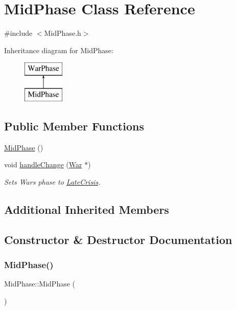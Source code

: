 \hypertarget{class_mid_phase}{}\section{Mid\+Phase Class Reference}
\label{class_mid_phase}


{\ttfamily \#include $<$Mid\+Phase.\+h$>$}

Inheritance diagram for Mid\+Phase\+:\begin{figure}[H]
\begin{center}
\leavevmode
\includegraphics[height=2.000000cm]{class_mid_phase}
\end{center}
\end{figure}
\subsection*{Public Member Functions}
\begin{DoxyCompactItemize}
\item 
\mbox{\hyperlink{class_mid_phase_a27b87eaf77be8ef4077a8ca2a86bc11b}{Mid\+Phase}} ()
\item 
void \mbox{\hyperlink{class_mid_phase_a7127c09e9eb9a19bb2973025760b67e8}{handle\+Change}} (\mbox{\hyperlink{class_war}{War}} $\ast$)
\begin{DoxyCompactList}\small\item\em Sets Wars phase to \mbox{\hyperlink{class_late_crisis}{Late\+Crisis}}. \end{DoxyCompactList}\end{DoxyCompactItemize}
\subsection*{Additional Inherited Members}


\subsection{Constructor \& Destructor Documentation}
\mbox{\label{class_mid_phase_a27b87eaf77be8ef4077a8ca2a86bc11b}} 
\subsubsection{\texorpdfstring{MidPhase()}{MidPhase()}}
{\footnotesize\ttfamily Mid\+Phase\+::\+Mid\+Phase (\begin{DoxyParamCaption}{ }\end{DoxyParamCaption})}



